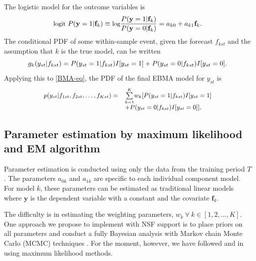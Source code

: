 \documentclass[pdftex,12pt,fullpage,oneside]{amsart}
\begin{document}
The logistic model for the outcome variables is %
\begin{equation} \small
\label{one}
\mbox{logit } P(\mathbf{y}=1|\mathbf{f}_k) \equiv \mbox{log}\frac{P(\mathbf{y}=1|\mathbf{f}_k)}{P(\mathbf{y}=0|\mathbf{f}_k)} = a_{k0}+a_{k1}\mathbf{f}_k .
\end{equation}
\noindent The conditional PDF of some within-sample event, given the
forecast $f_{kst}$ and the assumption that $k$ is the true model, can
be written
\begin{equation} 
\label{component-eq}
\small
g_k(y_{st}|f_{kst}) = P(y_{st}=1|f_{kst})I[y_{st}=1]  + P(y_{st}=0|f_{kst})I[y_{st}=0].
\end{equation}
Applying this to \eqref{BMA-eq}, the PDF of the final EBMA model for
$y_{st}$ is
\begin{equation}
\label{pdf}
\small
\begin{array}{rl}
p(y_{st}|f_{1st}, f_{2st}, \ldots, f_{Kst}) = &
\overset{K}{\underset{k=1}{\sum}} w_k [
P(y_{st}=1|f_{kst})I[y_{st}=1] \\
& + P(y_{st}=0|f_{kst})I[y_{st}=0]].\end{array}
\end{equation}

\subsection{Parameter estimation by maximum likelihood and EM
algorithm}

Parameter estimation is conducted using only the data from the
training period $T$.  The parameters $a_{0k}$ and $a_{1k}$ are
specific to each individual component model.  For model $k$, these
parameters can be estimated as traditional linear models where
$\mathbf{y}$ is the dependent variable with a constant and the
covariate $\mathbf{f}_k$.

The difficulty is in estimating the weighting parameters,
$w_k~\forall~ k \in [1, 2, \dots, K]$. One approach we
propose to implement with NSF support is to place priors on all
parameters and conduct a fully Bayesian analysis with Markov chain
Monte Carlo (MCMC) techniques \citep[c.f.][]{Vrugt:2008}.  For the moment,
however, we have followed \citet{Raftery:2005} and
\citet{Sloughter:2007} in using maximum likelihood methods.
\end{document}
